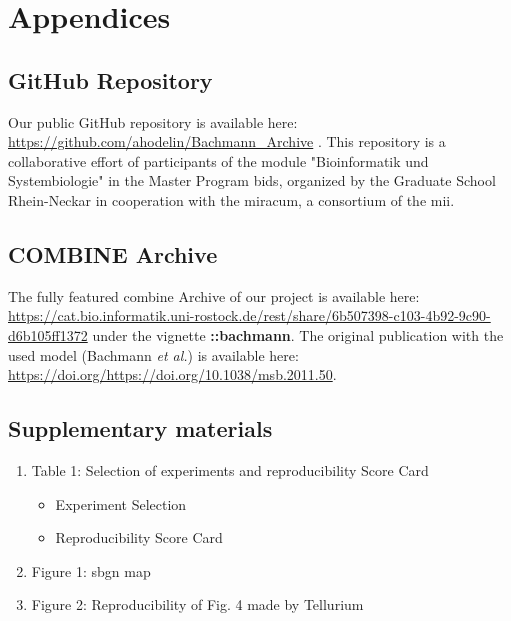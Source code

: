 \newpage
\section*{Appendices}

\subsection*{GitHub Repository} \label{git}

Our public GitHub repository is available here: \url{https://github.com/ahodelin/Bachmann_Archive} \cite{AbelHodelinHernandez.2021}.
This repository is a collaborative effort of participants of the module "Bioinformatik und Systembiologie" in the Master Program \ac{bids}, organized by the Graduate School Rhein-Neckar in cooperation with the \ac{miracum}, a consortium of the \ac{mii}.

\subsection*{COMBINE Archive}

The fully featured \ac{combine} Archive of our project is available here: \url{https://cat.bio.informatik.uni-rostock.de/rest/share/6b507398-c103-4b92-9c90-d6b105ff1372} under the vignette  \textbf{::bachmann}. The original publication with the used model (Bachmann \textit{et al.}) is available here: \url{https://doi.org/https://doi.org/10.1038/msb.2011.50}.

\subsection*{Supplementary materials}
\begin{enumerate}
    \item Table 1: Selection of experiments and reproducibility Score Card
    \begin{itemize}
        \item Experiment Selection
        \item Reproducibility Score Card
    \end{itemize}
    \item Figure 1: \ac{sbgn} map 
    \item Figure 2: Reproducibility of Fig. 4 made by Tellurium
\end{enumerate}